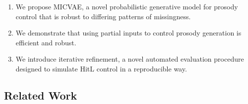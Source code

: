 \documentclass[a4paper,12pt,twoside,openright]{report}
\begin{document}
\begin{enumerate}
    \item We propose MICVAE, a novel probabilistic generative model for prosody control that is robust to differing patterns of missingness.
    \item We demonstrate that using partial inputs to control prosody generation is efficient and robust.
    \item We introduce iterative refinement, a novel automated evaluation procedure designed to simulate HitL control in a reproducible way.
\end{enumerate}


\subsection{Related Work}
\end{document}
